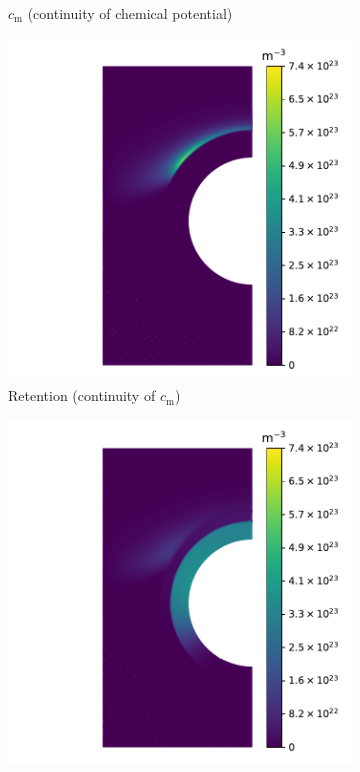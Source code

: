 \begin{figure}
\begin{subfigure}{0.5\linewidth}
        \caption{$c_\mathrm{m}$ (continuity of chemical potential)}
    \end{subfigure}
    \begin{subfigure}{0.5\linewidth}
        \centering
        \includegraphics[width=\linewidth]{Figures/Chapter3/monoblocks/interface_condition/iter case/retention_concentration.pdf}
        \caption{Retention (continuity of $c_\mathrm{m}$)}
    \end{subfigure}%
    \begin{subfigure}{0.5\linewidth}
        \centering
        \includegraphics[width=\linewidth]{Figures/Chapter3/monoblocks/interface_condition/iter case/retention_chemical_pot.pdf}

\end{subfigure}
\end{figure}
